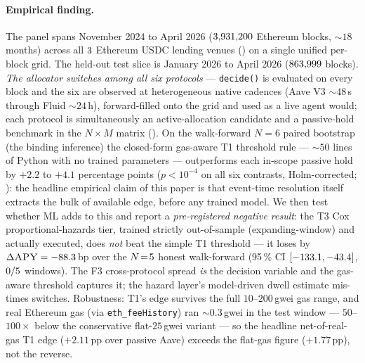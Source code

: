 \paragraph{Empirical finding.}
The panel spans November 2024 to April 2026 ($3{,}931{,}200$ Ethereum
blocks, $\sim 18$ months) across all $3$ Ethereum USDC
lending venues (\ProtocolList) on a single unified per-block grid.
The held-out test slice is January 2026 to April 2026 ($863{,}999$
blocks).  \emph{The allocator switches among all six protocols} ---
\texttt{decide()} is evaluated on every block and the six are
observed at heterogeneous native cadences (Aave V3 $\sim 48$\,s
through Fluid $\sim 24$\,h), forward-filled onto the grid and used as
a live agent would; each protocol is simultaneously an
active-allocation candidate and a passive-hold benchmark in the
$N\!\times\!M$ matrix ().  On the
walk-forward $N\!=\!6$ paired
bootstrap (the binding inference) the closed-form gas-aware T1
threshold rule --- $\sim 50$ lines of Python with no trained
parameters --- outperforms each in-scope passive hold by $+2.2$ to
$+4.1$ percentage points ($p<10^{-4}$ on all six contrasts, Holm-corrected;
): the headline empirical claim of this paper is
that event-time resolution itself extracts the bulk of available
edge, before any trained model.  We then test whether ML adds to
this and report a \emph{pre-registered negative result}: the T3
Cox proportional-hazards tier, trained strictly out-of-sample
(expanding-window) and actually executed, does \emph{not} beat the
simple T1 threshold --- it loses by $\Delta\textsc{APY} =
-88.3$\,bp over the $N\!=\!5$ honest
walk-forward (95\,\% CI $[-133.1, -43.4]$,
$0/5$ windows).  The F3 cross-protocol
spread \emph{is} the decision variable and the gas-aware threshold
captures it; the hazard layer's model-driven dwell estimate
mis-times switches.  Robustness: T1's edge survives the full
$10$--$200$\,gwei gas range, and real Ethereum gas
(via \texttt{eth\_feeHistory}) ran $\sim 0.3$\,gwei in the test
window --- $50$--$100\times$ below the conservative flat-$25$\,gwei
variant --- so the headline net-of-real-gas T1 edge ($+2.11$\,pp over
passive Aave) exceeds the flat-gas figure ($+1.77$\,pp), not the
reverse.

